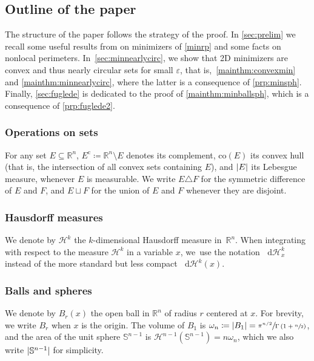 \documentclass[JEP,XML,SOM,Unicode,published]{cedram}
\numberwithin{equation}{section}
\theoremstyle{plain}
\theoremstyle{definition}
\newcommand{\numberset}[1]{{\mathbb{#1}}}
\newcommand{\R}{\numberset{R}}
\newcommand{\dH}{\mathop{}\mathopen{}\mathrm{d}\mathscr{H}}
\newcommand{\bbS}{\mathbb{S}}
\newcommand{\calH}{{\mathscr{H}}}
\let\om\omega
\let\eps\varepsilon
\newcommand{\co}{{\mathrm{co}}}
\newcommand{\Ren}{{\R^n}}
\newcommand{\compl}{{\mathrm{c}}}
\newcommand{\subsq}{\subseteq}
\DeclarePairedDelimiter{\abs}{\lvert}{\rvert}
\begin{document}
\subsection*{Outline of the paper}

The structure of the paper follows the strategy of the proof. In \cref{sec:prelim} we recall
some useful results from \cite{Peg2021} on minimizers of \cref{minrp} and some facts on nonlocal
perimeters.
In~\cref{sec:minnearlycirc}, we show that 2D minimizers are convex and thus nearly circular
sets for small $\eps$, that is,~\cref{mainthm:convexmin} and \cref{mainthm:minnearlycirc}, where
the latter is a consequence of \cref{prp:minsph}. Finally, \cref{sec:fuglede} is dedicated to the
proof of \cref{mainthm:minballsph}, which is a consequence of \cref{prp:fuglede2}.


\subsubsection*{Operations on sets}
For any set $E\subsq\Ren$, $E^\compl\coloneqq \Ren\setminus E$ denotes its complement, $\co(E)$ its
convex hull (that is, the intersection of all convex sets containing $E$), and $\abs{E}$ its
Lebesgue measure, whenever $E$ is measurable.
We write $E\triangle F$ for the symmetric difference of $E$ and $F$, and $E\sqcup F$ for the union
of $E$ and $F$ whenever they are disjoint.

\subsubsection*{Hausdorff measures}
We denote by $\calH^k$ the $k$-dimensional Hausdorff measure in~$\Ren$. When integrating with respect to the
measure $\calH^k$ in a variable $x$, we~use the notation $\dH_x^k$ instead of the more standard but
less compact $\dH^k(x)$.

\subsubsection*{Balls and spheres}
We denote by $B_r(x)$ the open ball in $\Ren$ of radius $r$ centered at $x$. For brevity, we write
$B_r$ when $x$ is the origin.
The volume of $B_1$ is $\om_n\coloneqq\abs{B_1} =
\sfrac{\pi^{n/2}}{\Gamma\left(1+\sfrac{n}{2}\right)}$, and the area of the unit sphere
$\bbS^{n-1}$ is $\calH^{n-1}(\bbS^{n-1})=n\om_n$, which we also write $\abs{\bbS^{n-1}}$ for
simplicity.
\end{document}
